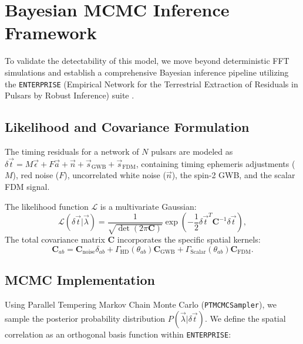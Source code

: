 \documentclass[aps,prd,twocolumn,nofootinbib,superscriptaddress,10pt]{revtex4-2}
\begin{document}
\section{Bayesian MCMC Inference Framework}

To validate the detectability of this model, we move beyond deterministic FFT simulations and establish a comprehensive Bayesian inference pipeline utilizing the \texttt{ENTERPRISE} (Empirical Network for the Terrestrial Extraction of Residuals in Pulsars by Robust Inference) suite \cite{Ellis2019}.

\subsection{Likelihood and Covariance Formulation}
The timing residuals for a network of $N$ pulsars are modeled as $\delta \vec{t} = M \vec{\epsilon} + F \vec{a} + \vec{n} + \vec{s}_{\text{GWB}} + \vec{s}_{\text{FDM}}$, containing timing ephemeris adjustments ($M$), red noise ($F$), uncorrelated white noise ($\vec{n}$), the spin-2 GWB, and the scalar FDM signal. 

The likelihood function $\mathcal{L}$ is a multivariate Gaussian:
\begin{equation}
    \mathcal{L}(\delta \vec{t} | \vec{\lambda}) = \frac{1}{\sqrt{\det(2\pi \mathbf{C})}} \exp\left(-\frac{1}{2}\delta \vec{t}^T \mathbf{C}^{-1} \delta \vec{t}\right),
\end{equation}
The total covariance matrix $\mathbf{C}$ incorporates the specific spatial kernels:
\begin{equation}
    \mathbf{C}_{ab} = \mathbf{C}_{\text{noise}}\delta_{ab} + \Gamma_{\text{HD}}(\theta_{ab}) \mathbf{C}_{\text{GWB}} + \Gamma_{\text{Scalar}}(\theta_{ab}) \mathbf{C}_{\text{FDM}}.
\end{equation}

\subsection{MCMC Implementation}
Using Parallel Tempering Markov Chain Monte Carlo (\texttt{PTMCMCSampler}), we sample the posterior probability distribution $P(\vec{\lambda} | \delta \vec{t})$. We define the spatial correlation as an orthogonal basis function within \texttt{ENTERPRISE}:
\end{document}
